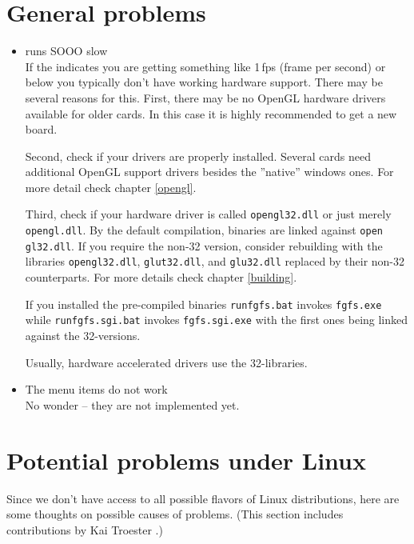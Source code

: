 \section{General problems}
\begin{itemize}
\item{\FlightGear runs SOOO slow}\\
 If the  indicates you are getting something like 1\,fps
 (frame per second) or below you typically don't have working hardware
  support. There may be several reasons for this. First,
 there may be no OpenGL hardware drivers available for older
 cards. In this case it is highly recommended to get a new board.

 Second, check if your drivers are properly installed. Several
 cards need additional OpenGL support drivers besides the
 ''native'' windows ones. For more detail check chapter
 \ref{opengl}.

 Third, check if your hardware driver is called \texttt{opengl32.dll}
 or just merely \texttt{opengl.dll}. By the default compilation, binaries are linked against
 \texttt{open} \texttt{gl32.dll}. If you require the non-32 version,
 consider rebuilding \FlightGear with the libraries \texttt{opengl32.dll},
 \texttt{glut32.dll}, and \texttt{glu32.dll} replaced by their
 non-32 counterparts. For more details check chapter
 \ref{building}.

 If you installed the pre-compiled binaries \texttt{runfgfs.bat} invokes
 \texttt{fgfs.exe} while \texttt{runfgfs.sgi.bat} invokes
 \texttt{fgfs.sgi.exe} with the first ones being linked against the 32-versions.

 Usually, hardware accelerated drivers use the 32-libraries.

\item{The menu items do not work}\\
 No wonder -- they are not implemented yet.

 \end{itemize}

\section{Potential problems under Linux}

Since we don't have access to all possible flavors of Linux distributions, here are some
thoughts on possible causes of problems. (This section includes contributions by Kai
Troester .)

